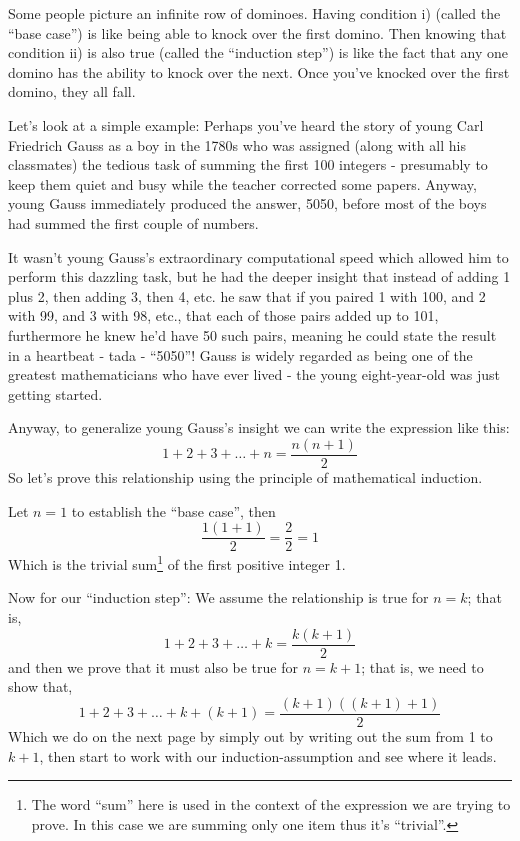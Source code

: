 \documentclass{article}
\begin{document}
Some people picture an infinite row of dominoes.
Having condition i) (called the ``base case'') is like being
able to knock over the first domino.
Then knowing that condition ii) is also true (called the ``induction step'') is like the
fact that any one domino has the ability to knock over the next.
Once you've knocked over the first domino,
they all fall.

Let's look at a simple example:
Perhaps you've heard the story of young Carl Friedrich Gauss
as a boy in
the 1780s who was assigned (along with all his classmates)
the tedious task of summing the first 100 integers -
presumably to keep them quiet and busy while the
teacher corrected some papers. Anyway,
young Gauss immediately produced the answer,
5050, before most of the boys had summed the first couple of numbers.

It wasn't young Gauss's extraordinary computational speed which allowed
him to perform this dazzling task,
but he had the deeper insight that instead of adding 1 plus 2,
then adding 3, then 4, etc.
he saw that if you paired 1 with 100,
and 2 with 99,
and 3 with 98,
etc.,
that each of those pairs added up to 101,
furthermore he knew he'd have 50 such pairs,
meaning he could state the result in a heartbeat - tada - ``5050''!
Gauss is widely regarded as being one of the greatest
mathematicians who have ever lived - the young eight-year-old was just getting started.

Anyway,
to generalize young Gauss's insight we can write the expression like this:
\[1+2+3+\ldots+n=\frac{n(n+1)}{2}\]
So let's prove this relationship using the principle of mathematical induction.
\bigskip

Let $n=1$ to establish the ``base case'',
then
\[\frac{1(1+1)}{2}=\frac{2}{2}=1\]
Which is the trivial sum\footnote{The word ``sum'' here is used
in the context of the expression
we are trying to prove. In this case we are summing
only one item thus it's ``trivial''.} of the first positive integer 1.

Now for our ``induction step'': We assume the relationship is true for $n=k$; that is,
\[1+2+3+\ldots+k=\frac{k(k+1)}{2}\]
and then we prove that it must also be true
for $n=k+1$; that is, we need to show that,
\[1+2+3+\ldots+k+(k+1)=\frac{(k+1)((k+1)+1)}{2}\]
Which we do on the next page by simply out by writing out the sum from 1 to \(k+1\), then
start to work with our induction-assumption and see where it leads.
\end{document}
